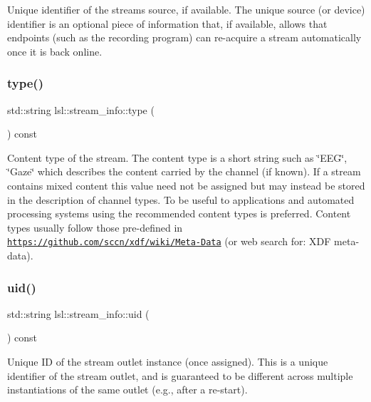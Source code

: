 Unique identifier of the stream\textquotesingle{}s source, if available. The unique source (or device) identifier is an optional piece of information that, if available, allows that endpoints (such as the recording program) can re-\/acquire a stream automatically once it is back online. \mbox{\label{classlsl_1_1stream__info_a2162830f6867e9513eba9385eb0cbb99}} 
\subsubsection{\texorpdfstring{type()}{type()}}
{\footnotesize\ttfamily std\+::string lsl\+::stream\+\_\+info\+::type (\begin{DoxyParamCaption}{ }\end{DoxyParamCaption}) const\hspace{0.3cm}{\ttfamily [inline]}}

Content type of the stream. The content type is a short string such as \char`\"{}\+E\+E\+G\char`\"{}, \char`\"{}\+Gaze\char`\"{} which describes the content carried by the channel (if known). If a stream contains mixed content this value need not be assigned but may instead be stored in the description of channel types. To be useful to applications and automated processing systems using the recommended content types is preferred. Content types usually follow those pre-\/defined in \href{https://github.com/sccn/xdf/wiki/Meta-Data}{\tt https\+://github.\+com/sccn/xdf/wiki/\+Meta-\/\+Data} (or web search for\+: X\+DF meta-\/data). \mbox{\label{classlsl_1_1stream__info_ae6fa890ffd440f298dd02fe71eaf3b82}} 
\subsubsection{\texorpdfstring{uid()}{uid()}}
{\footnotesize\ttfamily std\+::string lsl\+::stream\+\_\+info\+::uid (\begin{DoxyParamCaption}{ }\end{DoxyParamCaption}) const\hspace{0.3cm}{\ttfamily [inline]}}

Unique ID of the stream outlet instance (once assigned). This is a unique identifier of the stream outlet, and is guaranteed to be different across multiple instantiations of the same outlet (e.\+g., after a re-\/start). \mbox{\label{classlsl_1_1stream__info_aabd83f83d0abe8671e766e97f471dea9}} 
